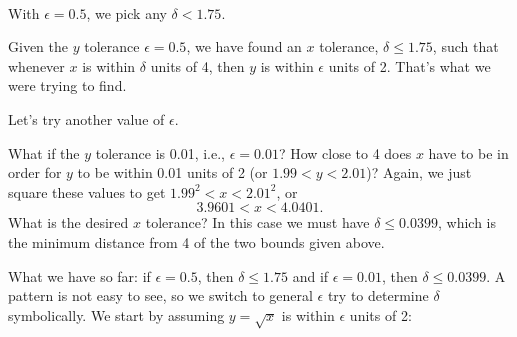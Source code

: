 \begin{example}
{
		\\
		\noindent
		With $\epsilon=0.5$, we pick any $\delta < 1.75$.}

		

Given the $y$ tolerance $\epsilon =0.5$, we have found an $x$ tolerance, $\delta \leq 1.75$, such that whenever $x$ is within $\delta$ units of 4, then $y$ is within $\epsilon$ units of 2.  That's what we were trying to find.\bigskip
  
Let's try another value of $\epsilon$.\bigskip

What if the $y$ tolerance is 0.01, i.e.,  $\epsilon =0.01$?  How close to 4 does $x$ have to be in order for $y$ to be within 0.01 units of 2 (or $1.99 < y < 2.01$)?  Again, we just square these values to get
$1.99^2 < x < 2.01^2$, or 
\[3.9601 < x < 4.0401\text{.}\]
What is the desired $x$ tolerance?  In this case we must have $\delta \leq 0.0399$, which is the minimum distance from 4 of the two bounds given above.  %

What we have so far: if $\epsilon =0.5$, then $\delta \leq 1.75$ and if $\epsilon = 0.01$, then $\delta \leq 0.0399$. A pattern is not easy to see, so we switch to general $\epsilon$ try to determine $\delta$ symbolically.  We start by assuming $y=\sqrt{x}$ is within $\epsilon$ units of 2:


\end{example}

